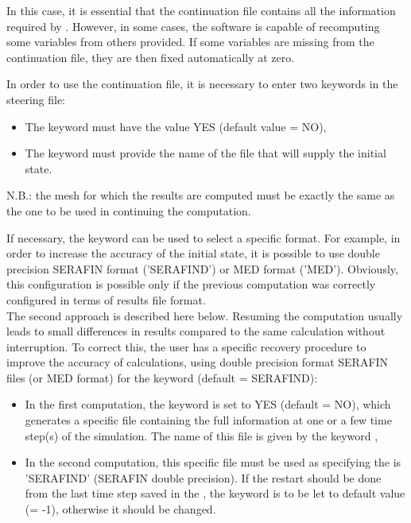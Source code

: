 In this case, it is essential that the continuation file contains
all the information required by \gaia{}.
However, in some cases, the software is capable of recomputing some
variables from others provided.
If some variables are missing from the continuation file,
they are then fixed automatically at zero.

In order to use the continuation file, it is necessary to enter
two keywords in the steering file:

\begin{itemize}
\item The keyword  must have the value YES
(default value = NO),

\item The keyword  must
provide the name of the file that will supply the initial state.
\end{itemize}

N.B.: the mesh for which the results are computed must be exactly the same
as the one to be used in continuing the computation.

If necessary, the keyword
can be used to select a specific format.
For example, in order to increase the accuracy of the initial state,
it is possible to use double precision SERAFIN format ('SERAFIND') or
MED format ('MED').
Obviously, this configuration is possible only if the previous computation
was correctly configured in terms of results file format.
\\

The second approach is described here below.
Resuming the computation usually leads to small differences in results
compared to the same calculation without interruption.
To correct this, the user has a specific recovery procedure
to improve the accuracy of calculations, using double precision format SERAFIN
files (or MED format) for the keyword 
(default = SERAFIND):

\begin{itemize}
\item In the first computation, the keyword  is set to
YES (default = NO),
which generates a specific file containing the full information at one or a
few time step(s) of the simulation.
The name of this file is given by the keyword ,

\item In the second computation, this specific file must be used as
 specifying the
 is 'SERAFIND'
(SERAFIN double precision).
If the restart should be done from the last time step saved in the
, the keyword  is to be
let to default value (= -1), otherwise it should be changed.
\end{itemize}

